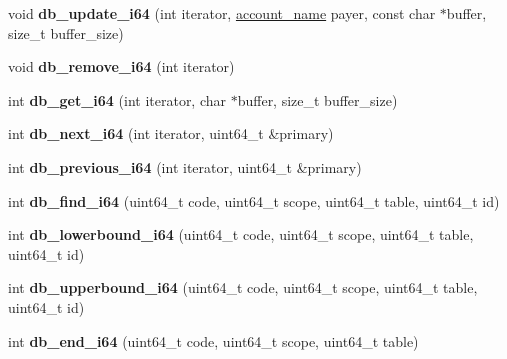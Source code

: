 \begin{DoxyCompactItemize}
void {\bfseries db\+\_\+update\+\_\+i64} (int iterator, \mbox{\hyperlink{structaacio_1_1chain_1_1name}{account\+\_\+name}} payer, const char $\ast$buffer, size\+\_\+t buffer\+\_\+size)
\item 
\mbox{\label{classaacio_1_1chain_1_1apply__context_a87df6ecc49f163b4219a957c96d12cf5}} 
void {\bfseries db\+\_\+remove\+\_\+i64} (int iterator)
\item 
\mbox{\label{classaacio_1_1chain_1_1apply__context_ab482f09ed45a8f27b38167e4b9b1a6be}} 
int {\bfseries db\+\_\+get\+\_\+i64} (int iterator, char $\ast$buffer, size\+\_\+t buffer\+\_\+size)
\item 
\mbox{\label{classaacio_1_1chain_1_1apply__context_a9de23edb08020386b2c920e629636c94}} 
int {\bfseries db\+\_\+next\+\_\+i64} (int iterator, uint64\+\_\+t \&primary)
\item 
\mbox{\label{classaacio_1_1chain_1_1apply__context_a6030a1251183efcc3812b77b7c27e843}} 
int {\bfseries db\+\_\+previous\+\_\+i64} (int iterator, uint64\+\_\+t \&primary)
\item 
\mbox{\label{classaacio_1_1chain_1_1apply__context_a73cce1c894639be01b95ba5ef39193ea}} 
int {\bfseries db\+\_\+find\+\_\+i64} (uint64\+\_\+t code, uint64\+\_\+t scope, uint64\+\_\+t table, uint64\+\_\+t id)
\item 
\mbox{\label{classaacio_1_1chain_1_1apply__context_addbdd23d07596e1187656c123181b9b6}} 
int {\bfseries db\+\_\+lowerbound\+\_\+i64} (uint64\+\_\+t code, uint64\+\_\+t scope, uint64\+\_\+t table, uint64\+\_\+t id)
\item 
\mbox{\label{classaacio_1_1chain_1_1apply__context_a8336d3b2bb651b3f35bd548b5772280f}} 
int {\bfseries db\+\_\+upperbound\+\_\+i64} (uint64\+\_\+t code, uint64\+\_\+t scope, uint64\+\_\+t table, uint64\+\_\+t id)
\item 
\mbox{\label{classaacio_1_1chain_1_1apply__context_a9410ac759dcb787cf31b92f941955510}} 
int {\bfseries db\+\_\+end\+\_\+i64} (uint64\+\_\+t code, uint64\+\_\+t scope, uint64\+\_\+t table)
\end{DoxyCompactItemize}
